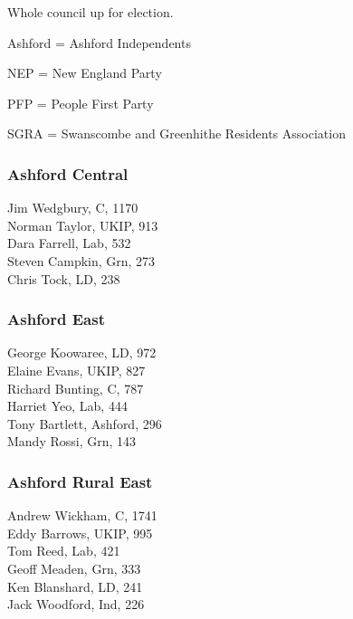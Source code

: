 \documentclass[a4paper,openany,10pt]{book}
\begin{document}
Whole council up for election.

Ashford = Ashford Independents

NEP = New England Party

PFP = People First Party

SGRA = Swanscombe and Greenhithe Residents Association



\subsubsection*{Ashford Central}



Jim Wedgbury, C, 1170\\
Norman Taylor, UKIP, 913\\
Dara Farrell, Lab, 532\\
Steven Campkin, Grn, 273\\
Chris Tock, LD, 238\\


\subsubsection*{Ashford East}



George Koowaree, LD, 972\\
Elaine Evans, UKIP, 827\\
Richard Bunting, C, 787\\
Harriet Yeo, Lab, 444\\
Tony Bartlett, Ashford, 296\\
Mandy Rossi, Grn, 143\\


\subsubsection*{Ashford Rural East}



Andrew Wickham, C, 1741\\
Eddy Barrows, UKIP, 995\\
Tom Reed, Lab, 421\\
Geoff Meaden, Grn, 333\\
Ken Blanshard, LD, 241\\
Jack Woodford, Ind, 226\\
\end{document}
